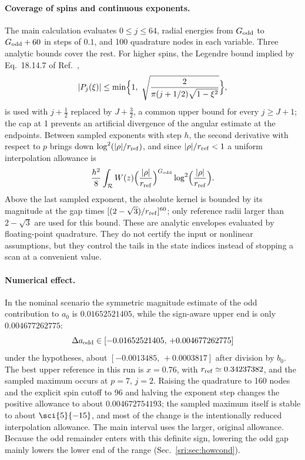 \paragraph{Coverage of spins and continuous exponents.} The main calculation evaluates $0\le j\le64$, radial energies
from $G_{\rm odd}$ to $G_{\rm odd}+60$ in steps of $0.1$, and 100 quadrature nodes in each variable. Three analytic
bounds cover the rest. For higher spins, the Legendre bound implied by Eq.~18.14.7 of Ref.~\cite{sri:NIST:DLMF},
\begin{equation}
 |P_j(\xi)|\le\min\Bigl\{1,\ \sqrt{\frac{2}{\pi(j+1/2)\sqrt{1-\xi^2}}}\Bigr\},
 \label{sri:eq:cone:legendre}
\end{equation}
is used with $j+\frac12$ replaced by $J+\frac32$, a common upper bound for every $j\ge J+1$; the cap at 1 prevents an
artificial divergence of the angular estimate at the endpoints. Between sampled exponents with step $h$, the second
derivative with respect to $p$ brings down $\log^2(|\rho|/r_{\rm ref})$, and since $|\rho|/r_{\rm ref}<1$ a uniform
interpolation allowance is
\begin{equation}
 \frac{h^2}{8}\int_{\mathcal R}W(z)\Bigl(\frac{|\rho|}{r_{\rm ref}}\Bigr)^{G_{\rm odd}}\log^2\Bigl(\frac{|\rho|}{r_{\rm ref}}\Bigr).
 \label{sri:eq:cone:interp}
\end{equation}
Above the last sampled exponent, the absolute kernel is bounded by its magnitude at the gap times
$[(2-\sqrt3)/r_{\rm ref}]^{60}$; only reference radii larger than $2-\sqrt3$ are used for this bound. These are
analytic envelopes evaluated by floating-point quadrature. They do not certify the input or nonlinear assumptions, but
they control the tails in the state indices instead of stopping a scan at a convenient value.

\paragraph{Numerical effect.} In the nominal scenario the symmetric magnitude estimate of the odd contribution to $a_0$
is $0.01652521405$, while the sign-aware upper end is only $0.004677262775$:
\begin{equation}
 \Delta a_{\rm odd}\in[-0.01652521405,\,+0.004677262775]
 \label{sri:eq:cone:oddint}
\end{equation}
under the hypotheses, about $[-0.0013485,\,+0.0003817]$ after division by $b_0$. The best upper reference in this run is
$x=0.76$, with $r_{\rm ref}\simeq0.34237382$, and the sampled maximum occurs at $p=7$, $j=2$. Raising the quadrature to
160 nodes and the explicit spin cutoff to 96 and halving the exponent step changes the positive allowance to about
$0.004672754193$; the sampled maximum itself is stable to about $\sci{5}{-15}$, and most of the change is the
intentionally reduced interpolation allowance. The main interval uses the larger, original allowance. Because the odd
remainder enters with this definite sign, lowering the odd gap mainly lowers the lower end of the range
(Sec.~\ref{sri:sec:howcond}).

